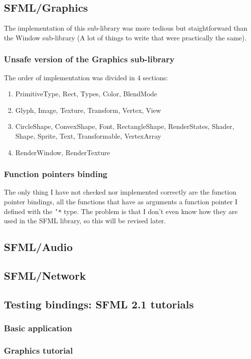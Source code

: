\documentclass[latterpaper, leqno]{article}
\begin{document}
\subsection{SFML/Graphics}
The implementation of this sub-library was more tedious but staightforward than the Window sub-library (A lot of things to write that were practically the same).

\subsubsection*{Unsafe version of the Graphics sub-library}
The order of implementation was divided in 4 sections:
\begin{enumerate}
\item PrimitiveType, Rect, Types, Color, BlendMode
\item Glyph, Image, Texture, Transform, Vertex, View
\item CircleShape, ConvexShape, Font, RectangleShape, RenderStates, Shader, Shape, Sprite, Text, Transformable, VertexArray
\item RenderWindow, RenderTexture
\end{enumerate}

\subsubsection*{Function pointers binding}
The only thing I have not checked nor implemented correctly are the function pointer bindings, all the functions that have as arguments a function pointer I defined with the \texttt{'*} type. The problem is that I don't even know how they are used in the SFML library, so this will be revised later.

\subsection{SFML/Audio}
\subsection{SFML/Network}
\subsection{Testing bindings: SFML 2.1 tutorials}
\subsubsection*{Basic application}
\subsubsection*{Graphics tutorial}
\end{document}
